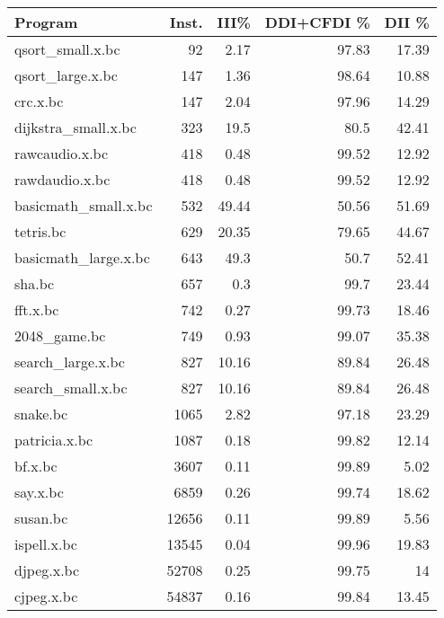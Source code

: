 \begin{tabular}{lrrrr}
\hline
 Program              &   Inst. &   III\% &   DDI+CFDI \% &   DII \% \\
\hline
 qsort\_small.x.bc     &      92 &   2.17 &        97.83 &   17.39 \\
 qsort\_large.x.bc     &     147 &   1.36 &        98.64 &   10.88 \\
 crc.x.bc             &     147 &   2.04 &        97.96 &   14.29 \\
 dijkstra\_small.x.bc  &     323 &  19.5  &        80.5  &   42.41 \\
 rawcaudio.x.bc       &     418 &   0.48 &        99.52 &   12.92 \\
 rawdaudio.x.bc       &     418 &   0.48 &        99.52 &   12.92 \\
 basicmath\_small.x.bc &     532 &  49.44 &        50.56 &   51.69 \\
 tetris.bc            &     629 &  20.35 &        79.65 &   44.67 \\
 basicmath\_large.x.bc &     643 &  49.3  &        50.7  &   52.41 \\
 sha.bc               &     657 &   0.3  &        99.7  &   23.44 \\
 fft.x.bc             &     742 &   0.27 &        99.73 &   18.46 \\
 2048\_game.bc         &     749 &   0.93 &        99.07 &   35.38 \\
 search\_large.x.bc    &     827 &  10.16 &        89.84 &   26.48 \\
 search\_small.x.bc    &     827 &  10.16 &        89.84 &   26.48 \\
 snake.bc             &    1065 &   2.82 &        97.18 &   23.29 \\
 patricia.x.bc        &    1087 &   0.18 &        99.82 &   12.14 \\
 bf.x.bc              &    3607 &   0.11 &        99.89 &    5.02 \\
 say.x.bc             &    6859 &   0.26 &        99.74 &   18.62 \\
 susan.bc             &   12656 &   0.11 &        99.89 &    5.56 \\
 ispell.x.bc          &   13545 &   0.04 &        99.96 &   19.83 \\
 djpeg.x.bc           &   52708 &   0.25 &        99.75 &   14    \\
 cjpeg.x.bc           &   54837 &   0.16 &        99.84 &   13.45 \\
\hline

\end{tabular}

